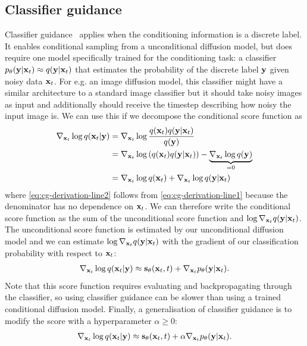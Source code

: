 \subsection{Classifier guidance}
Classifier guidance~\citep{song2020score} applies when the conditioning information is a discrete label. It enables conditional sampling from a unconditional diffusion model, but does require one model specifically trained for the conditioning task: a classifier $p_\theta({\mathbf{y}}|{\mathbf{x}}_t) \approx q({\mathbf{y}}|{\mathbf{x}}_t)$ that estimates the probability of the discrete label ${\mathbf{y}}$ given noisy data ${\mathbf{x}}_t$. For e.g. an image diffusion model, this classifier might have a similar architecture to a standard image classifier but it should take noisy images as input and additionally should receive the timestep describing how noisy the input image is. We can use this if we decompose the conditional score function as
\begin{align}
    \nabla_{{\mathbf{x}}_t} \log q({\mathbf{x}}_t|{\mathbf{y}}) &= \nabla_{{\mathbf{x}}_t} \log \frac{q({\mathbf{x}}_t)q({\mathbf{y}}|{\mathbf{x}}_t)}{q({\mathbf{y}})} \label{eq:cg-derivation-line1} \\
    &= \nabla_{{\mathbf{x}}_t} \log \left( q({\mathbf{x}}_t) q({\mathbf{y}}|{\mathbf{x}}_t) \right) - \underbrace{\nabla_{{\mathbf{x}}_t} \log q({\mathbf{y}})}_{=0}  \label{eq:cg-derivation-line2} \\
    &= \nabla_{{\mathbf{x}}_t} \log q({\mathbf{x}}_t) + \nabla_{{\mathbf{x}}_t} \log q({\mathbf{y}}|{\mathbf{x}}_t)  \label{eq:cg-derivation-line3}
\end{align}
where \cref{eq:cg-derivation-line2} follows from \cref{eq:cg-derivation-line1} because the denominator has no dependence on ${\mathbf{x}}_t$. We can therefore write the conditional score function as the sum of the unconditional score function and $\log \nabla_{{\mathbf{x}}_t} q({\mathbf{y}}|{\mathbf{x}}_t)$. The unconditional score function is estimated by our unconditional diffusion model and we can estimate $\log \nabla_{{\mathbf{x}}_t} q({\mathbf{y}}|{\mathbf{x}}_t)$ with the gradient of our classification probability with respect to ${\mathbf{x}}_t$:
\begin{align}
    \nabla_{{\mathbf{x}}_t} \log q({\mathbf{x}}_t|{\mathbf{y}}) \approx {\mathbf{s}}_\theta({\mathbf{x}}_t, t) + \nabla_{{\mathbf{x}}_t} p_\theta({\mathbf{y}}|{\mathbf{x}}_t).
\end{align}
Note that this score function requires evaluating and backpropagating through the classifier, so using classifier guidance can be slower than using a trained conditional diffusion model. Finally, a generalisation of classifier guidance is to modify the score with a hyperparameter $\alpha \geq 0$:
\begin{align}
    \nabla_{{\mathbf{x}}_t} \log q({\mathbf{x}}_t|{\mathbf{y}}) \approx {\mathbf{s}}_\theta({\mathbf{x}}_t, t) + \alpha \nabla_{{\mathbf{x}}_t} p_\theta({\mathbf{y}}|{\mathbf{x}}_t). \label{eq:cg-score-function}
\end{align}
